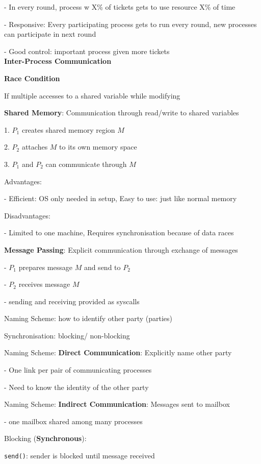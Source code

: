 \documentclass[10pt, a4paper]{article}
\newcommand{\blue}[1]{{\color{MidnightBlue}#1}}
\newcommand{\red}[1]{{\color{red}#1}}
\newcommand{\green}[1]{{\color{ForestGreen}#1}}
\newcommand{\header}[1]{{\normalsize\textbf{#1}}}
\begin{document}
\begin{multicols*}{3}
		- In every round, process w \blue{X\%} of tickets gets to use resource \blue{X\%} of time

		- \red{Responsive}: Every participating process gets to run every round, new processes can participate in next round

		- \red{Good control}: important process given more tickets\\

		\header{Inter-Process Communication}

		\textbf{Race Condition}

		If multiple accesses to a shared variable while modifying
		
		\textbf{Shared Memory}: Communication through read/write to shared variables

		1. $P_1$ creates shared memory region $M$

		2. $P_2$ attaches $M$ to its own memory space

		3. $P_1$ and $P_2$ can communicate through $M$

		\green{Advantages:}

		- Efficient: OS only needed in setup, Easy to use: just like normal memory

		\red{Disadvantages:}

		- Limited to one machine, Requires synchronisation because of data races

		\textbf{Message Passing}: \red{Explicit} communication through exchange of messages

		- $P_1$ prepares message $M$ and send to $P_2$

		- $P_2$ receives message $M$

		- sending and receiving provided as syscalls

		Naming Scheme: how to identify other party (parties)

		Synchronisation: blocking/ non-blocking

		Naming Scheme: \textbf{Direct Communication}: \red{Explicitly name} other party

		- One link per pair of communicating processes

		- Need to know the identity of the other party

		Naming Scheme: \textbf{Indirect Communication}: Messages sent to mailbox

		- one mailbox shared among many processes

		Blocking (\textbf{Synchronous}):

		\texttt{send()}: sender is blocked until message received


\end{multicols*}
\end{document}
